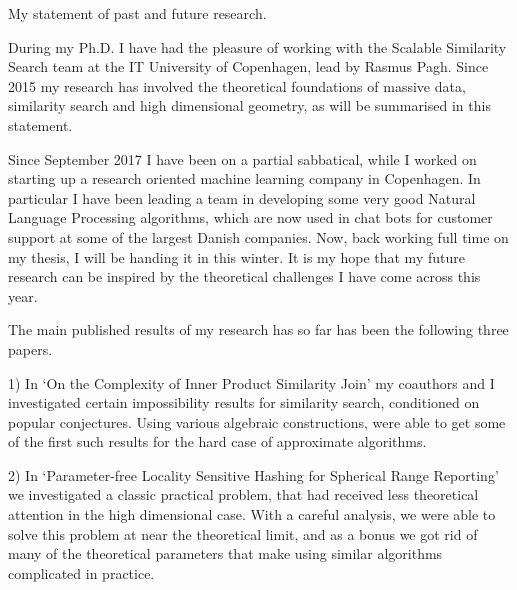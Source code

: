 \documentclass[10pt]{article}
\title{}
\begin{document}





My statement of past and future research.

During my Ph.D. I have had the pleasure of working with the Scalable Similarity Search team at the IT University of Copenhagen, lead by Rasmus Pagh.
Since 2015 my research has involved the theoretical foundations of massive data, similarity search and high dimensional geometry, as will be summarised in this statement.

Since September 2017 I have been on a partial sabbatical, while I worked on starting up a research oriented machine learning company in Copenhagen.
In particular I have been leading a team in developing some very good Natural Language Processing algorithms, which are now used in chat bots for customer support at some of the largest Danish companies.
Now, back working full time on my thesis, I will be handing it in this winter.
It is my hope that my future research can be inspired by the theoretical challenges I have come across this year.

The main published results of my research has so far has been the following three papers.

1) In `On the Complexity of Inner Product Similarity Join'\cite{ahle2016complexity} my coauthors and I investigated certain impossibility results for similarity search, conditioned on popular conjectures.
Using various algebraic constructions, were able to get some of the first such results for the hard case of approximate algorithms.

2) In `Parameter-free Locality Sensitive Hashing for Spherical Range Reporting' \cite{ahle2017parameter} we investigated a classic practical problem, that had received less theoretical attention in the high dimensional case.
With a careful analysis, we were able to solve this problem at near the theoretical limit, and as a bonus we got rid of many of the theoretical parameters that make using similar algorithms complicated in practice.
\end{document}

